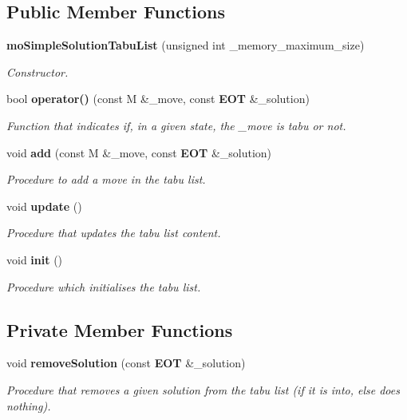 \subsection*{Public Member Functions}
\begin{CompactItemize}
\item 
{\bf mo\-Simple\-Solution\-Tabu\-List} (unsigned int \_\-memory\_\-maximum\_\-size)
\begin{CompactList}\small\item\em Constructor. \item\end{CompactList}\item 
bool {\bf operator()} (const M \&\_\-move, const {\bf EOT} \&\_\-solution)
\begin{CompactList}\small\item\em Function that indicates if, in a given state, the \_\-move is tabu or not. \item\end{CompactList}\item 
void {\bf add} (const M \&\_\-move, const {\bf EOT} \&\_\-solution)
\begin{CompactList}\small\item\em Procedure to add a move in the tabu list. \item\end{CompactList}\item 
void {\bf update} ()
\begin{CompactList}\small\item\em Procedure that updates the tabu list content. \item\end{CompactList}\item 
void {\bf init} ()
\begin{CompactList}\small\item\em Procedure which initialises the tabu list. \item\end{CompactList}\end{CompactItemize}
\subsection*{Private Member Functions}
\begin{CompactItemize}
\item 
void {\bf remove\-Solution} (const {\bf EOT} \&\_\-solution)
\begin{CompactList}\small\item\em Procedure that removes a given solution from the tabu list (if it is into, else does nothing). \item\end{CompactList}\end{CompactItemize}
